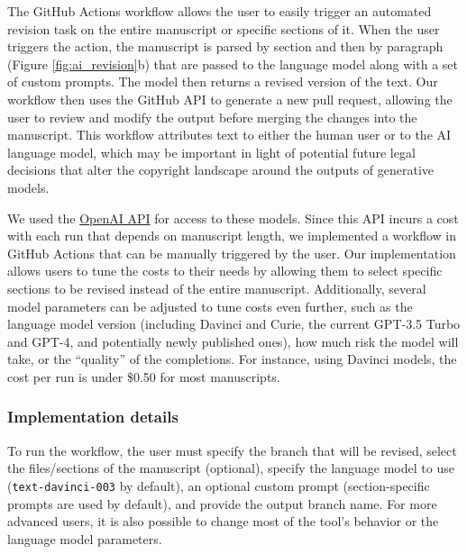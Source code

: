 \documentclass[
]{article}
\begin{document}
The GitHub Actions workflow allows the user to easily trigger an automated revision task on the entire manuscript or specific sections of it.
When the user triggers the action, the manuscript is parsed by section and then by paragraph (Figure \ref{fig:ai_revision}b) that are passed to the language model along with a set of custom prompts.
The model then returns a revised version of the text.
Our workflow then uses the GitHub API to generate a new pull request, allowing the user to review and modify the output before merging the changes into the manuscript.
This workflow attributes text to either the human user or to the AI language model, which may be important in light of potential future legal decisions that alter the copyright landscape around the outputs of generative models.

We used the \href{https://openai.com/api/}{OpenAI API} for access to these models.
Since this API incurs a cost with each run that depends on manuscript length, we implemented a workflow in GitHub Actions that can be manually triggered by the user.
Our implementation allows users to tune the costs to their needs by allowing them to select specific sections to be revised instead of the entire manuscript.
Additionally, several model parameters can be adjusted to tune costs even further, such as the language model version (including Davinci and Curie, the current GPT-3.5 Turbo and GPT-4, and potentially newly published ones), how much risk the model will take, or the ``quality'' of the completions.
For instance, using Davinci models, the cost per run is under \$0.50 for most manuscripts.

\hypertarget{implementation-details}{%
\subsubsection{Implementation details}\label{implementation-details}}

To run the workflow, the user must specify the branch that will be revised, select the files/sections of the manuscript (optional), specify the language model to use (\texttt{text-davinci-003} by default), an optional custom prompt (section-specific prompts are used by default), and provide the output branch name.
For more advanced users, it is also possible to change most of the tool's behavior or the language model parameters.
\end{document}
